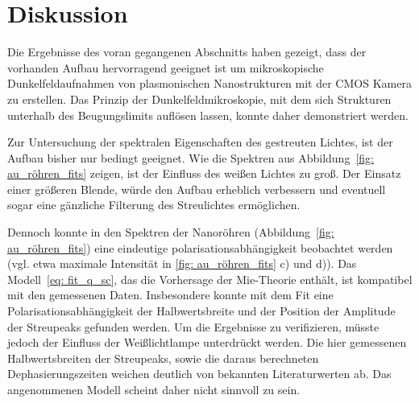 \section{Diskussion}
Die Ergebnisse des voran gegangenen Abschnitts haben gezeigt, dass der vorhanden Aufbau hervorragend geeignet ist
um mikroskopische Dunkelfeldaufnahmen von plasmonischen Nanostrukturen mit der CMOS Kamera zu erstellen. Das Prinzip
der Dunkelfeldmikroskopie, mit dem sich Strukturen unterhalb des Beugungslimits auflösen lassen, konnte daher
demonstriert werden.

Zur Untersuchung der spektralen Eigenschaften des gestreuten Lichtes, ist der Aufbau bisher nur bedingt geeignet.
Wie die Spektren aus Abbildung~\ref{fig: au_röhren_fits} zeigen, ist der Einfluss des weißen Lichtes zu groß. Der Einsatz einer
größeren Blende, würde den Aufbau erheblich verbessern und eventuell sogar eine gänzliche Filterung des Streulichtes
ermöglichen.

Dennoch konnte in den Spektren der Nanoröhren (Abbildung~\ref{fig: au_röhren_fits}) eine eindeutige
polarisationsabhängigkeit beobachtet werden (vgl. etwa maximale Intensität in \ref{fig: au_röhren_fits} c) und d)).
Das Modell~\eqref{eq: fit_q_sc}, das die Vorhersage der Mie-Theorie enthält, ist kompatibel mit den
gemessenen Daten. Insbesondere konnte mit dem Fit eine Polarisationsabhängigkeit der Halbwertsbreite und der Position der
Amplitude der Streupeaks gefunden werden. Um die Ergebnisse zu verifizieren, müsste
jedoch der Einfluss der Weißlichtlampe unterdrückt werden. Die hier gemessenen Halbwertsbreiten der Streupeaks, sowie
die daraus berechneten Dephasierungszeiten weichen deutlich von bekannten Literaturwerten ab. Das angenommenen Modell
scheint daher nicht sinnvoll zu sein.
